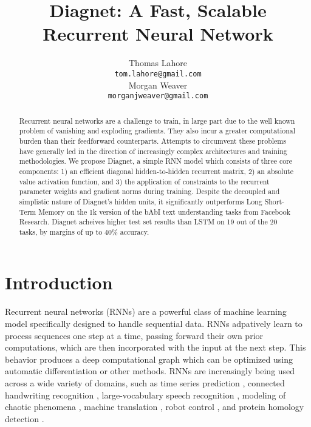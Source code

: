 \documentclass{article}
\title{Diagnet: A Fast, Scalable Recurrent Neural Network}
\author{
Thomas Lahore\\
\texttt{tom.lahore@gmail.com}\\
\And
Morgan Weaver\\
\texttt{morganjweaver@gmail.com}
}
\begin{document}
\maketitle
\begin{abstract}

Recurrent neural networks are a challenge to train, in large part due to the well known problem of vanishing and exploding gradients. They also incur a greater computational burden than their feedforward counterparts. Attempts to circumvent these problems have generally led in the direction of increasingly complex architectures and training methodologies. We propose Diagnet, a simple RNN model which consists of three core components: 1) an efficient diagonal hidden-to-hidden recurrent matrix, 2) an absolute value activation function, and 3) the application of constraints to the recurrent parameter weights and gradient norms during training. Despite the decoupled and simplistic nature of Diagnet's hidden units, it significantly outperforms Long Short-Term Memory on the 1k version of the bAbI text understanding tasks from Facebook Research. Diagnet acheives higher test set results than LSTM on 19 out of the 20 tasks, by margins of up to 40\% accuracy.

  

\end{abstract}

\section{Introduction}

Recurrent neural networks (RNNs) are a powerful class of machine learning model specifically designed to handle sequential data. RNNs adpatively learn to process sequences one step at a time, passing forward their own prior computations, which are then incorporated with the input at the next step. This behavior produces a deep computational graph which can be optimized using automatic differentiation or other methods. RNNs are increasingly being used across a wide variety of domains, such as time series prediction \citep{Giles2001}, connected handwriting recognition \citep{graves2009offline}, large-vocabulary speech recognition \citep{SakSB14}, modeling of chaotic phenomena \citep{PhysRevLett.120.024102}, machine translation \citep{bahdanau2014neural, mikolov2010recurrent}, robot control \citep{oubbati2005kinematic}, and protein homology detection \citep{el2008predicting}.
\end{document}
